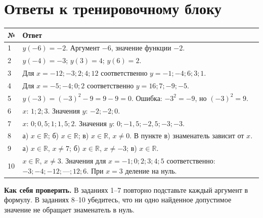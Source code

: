 \documentclass[a4paper,12pt]{article}
\newcommand{\key}[1]{\textbf{\color{darkaccent}#1}}
\newcommand{\sectionrule}{\vspace{-0.55em}{\color{accent}\hrule height .6pt}\vspace{0.5em}}
\begin{document}
\section*{Ответы к тренировочному блоку}
\sectionrule
\begin{center}
\renewcommand{\arraystretch}{1.48}
\begin{tabularx}{\linewidth}{@{}p{10mm}X@{}}
\toprule
\textbf{№} & \textbf{Ответ}\\
\midrule
1 & $y(-6)=-2$. Аргумент $-6$, значение функции $-2$.\\
2 & $y(-4)=-3$; $y(3)=4$; $y(6)=2$.\\
3 & Для $x=-12;-3;2;4;12$ соответственно $y=-1;-4;6;3;1$.\\
4 & Для $x=-5;-4;0;2$ соответственно $y=16;7;-9;-5$.\\
5 & $y(-3)=(-3)^2-9=9-9=0$. Ошибка: $-3^2=-9$, но $(-3)^2=9$.\\
6 & $x$: $1;2;3$. Значения $y$: $-2;-2;0$.\\
7 & $x$: $0;0{,}5;1;1{,}5;2$. Значения $y$: $0;-1{,}5;-2{,}5;-3;-3$.\\
8 & а) $x\in\mathbb R$; б) $x\in\mathbb R$; в) $x\in\mathbb R$, $x\ne0$. В пункте в) знаменатель зависит от $x$.\\
9 & а) $x\in\mathbb R$, $x\ne7$; б) $x\in\mathbb R$, $x\ne-3$; в) $x\in\mathbb R$.\\
10 & $x\in\mathbb R$, $x\ne3$. Значения для $x=-1;0;2;3;4;5$ соответственно: $-3;-4;-12;\text{---};12;6$. При $x=3$ деление на нуль.\\
\bottomrule
\end{tabularx}
\end{center}
\vspace{1em}
\key{Как себя проверить.} В заданиях 1--7 повторно подставьте каждый аргумент в формулу. В заданиях 8--10 убедитесь, что ни одно найденное допустимое значение не обращает знаменатель в нуль.
\end{document}
